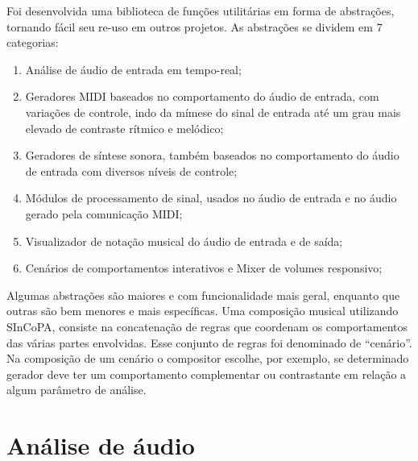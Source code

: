 \documentclass[draft]{ppgmus}
\begin{document}
  Foi desenvolvida uma biblioteca de funções utilitárias em forma de abstrações, 
tornando fácil seu re-uso em outros projetos. As abstrações se dividem em 7 categorias:

\begin{enumerate}
 \item Análise de áudio de entrada em tempo-real;
 \item Geradores MIDI baseados no comportamento do áudio de 
entrada, com variações de controle, indo da mímese do sinal de entrada
até um grau mais elevado de contraste rítmico e melódico;
 \item Geradores de síntese sonora, também baseados no comportamento
do áudio de entrada com diversos níveis de controle;
 \item Módulos de processamento de sinal, usados no áudio de entrada e no
áudio gerado pela comunicação MIDI;
 \item Visualizador de notação musical do áudio de entrada e de saída;
 \item Cenários de comportamentos interativos e Mixer de volumes responsivo;
 
\end{enumerate}

Algumas abstrações são maiores e com funcionalidade mais geral, enquanto
que outras são bem menores e mais específicas.
Uma composição musical utilizando SInCoPA, consiste na concatenação de
regras que coordenam os comportamentos das várias partes envolvidas.
Esse conjunto de regras foi denominado de ``cenário''. Na composição
de um cenário o compositor escolhe, por exemplo,  se determinado gerador 
deve ter um comportamento complementar ou contrastante  em relação a algum
parâmetro de análise.









\section{Análise de áudio}
\end{document}
